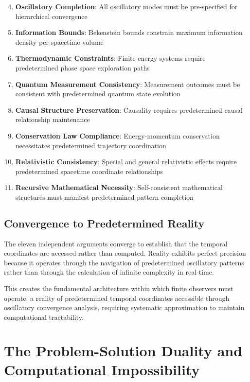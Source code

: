 \documentclass[12pt,a4paper]{article}
\begin{document}
\begin{enumerate}
\setcounter{enumi}{3}
\item \textbf{Oscillatory Completion}: All oscillatory modes must be pre-specified for hierarchical convergence
\item \textbf{Information Bounds}: Bekenstein bounds constrain maximum information density per spacetime volume
\item \textbf{Thermodynamic Constraints}: Finite energy systems require predetermined phase space exploration paths
\item \textbf{Quantum Measurement Consistency}: Measurement outcomes must be consistent with predetermined quantum state evolution
\item \textbf{Causal Structure Preservation}: Causality requires predetermined causal relationship maintenance
\item \textbf{Conservation Law Compliance}: Energy-momentum conservation necessitates predetermined trajectory coordination
\item \textbf{Relativistic Consistency}: Special and general relativistic effects require predetermined spacetime coordinate relationships
\item \textbf{Recursive Mathematical Necessity}: Self-consistent mathematical structures must manifest predetermined pattern completion
\end{enumerate}

\subsection{Convergence to Predetermined Reality}

The eleven independent arguments converge to establish that the temporal coordinates are accessed rather than computed. Reality exhibits perfect precision because it operates through the navigation of predetermined oscillatory patterns rather than through the calculation of infinite complexity in real-time.

This creates the fundamental architecture within which finite observers must operate: a reality of predetermined temporal coordinates accessible through oscillatory convergence analysis, requiring systematic approximation to maintain computational tractability.

\section{The Problem-Solution Duality and Computational Impossibility}
\end{document}
